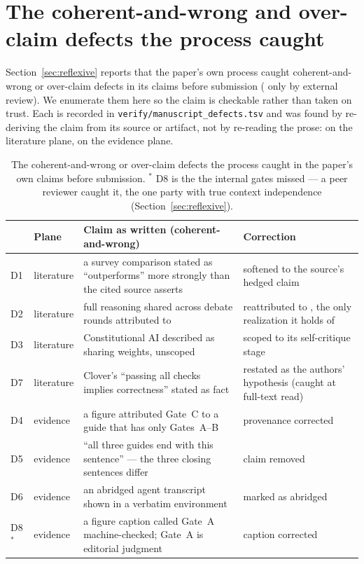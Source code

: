 \documentclass[11pt]{article}
\newcommand{\code}[1]{\texttt{#1}}
\begin{document}
\appendix
\section{The coherent-and-wrong and over-claim defects the process caught}
\label{app:reflexdefects}

Section~\ref{sec:reflexive} reports that the paper's own process caught \ResReflexDefects{}
coherent-and-wrong or over-claim defects in its claims before submission
(\ResCalibExternalCatches{} only by external review). We enumerate them here so the claim is
checkable rather than taken on trust. Each is recorded in
\code{verify/manuscript\_defects.tsv} and was found by re-deriving the claim from its source
or artifact, not by re-reading the prose: \ResReflexDefectsLit{} on the literature plane,
\ResReflexDefectsEvid{} on the evidence plane.

\begin{table}[h]
\centering\small
\begin{tabularx}{\textwidth}{@{}l l Y Y@{}}
\toprule
 & \textbf{Plane} & \textbf{Claim as written (coherent-and-wrong)} & \textbf{Correction} \\
\midrule
D1 & literature & a survey comparison stated as ``outperforms'' more strongly than the cited
source asserts & softened to the source's hedged claim \\
\addlinespace
D2 & literature & full reasoning shared across debate rounds attributed to
\citet{irving2018debate} & reattributed to \citet{du2023debate}, the only realization it
holds of \\
\addlinespace
D3 & literature & Constitutional AI described as sharing weights, unscoped & scoped to its
self-critique stage \\
\addlinespace
D7 & literature & Clover's ``passing all checks implies correctness'' stated as fact & restated
as the authors' hypothesis (caught at full-text read) \\
\addlinespace
D4 & evidence & a figure attributed Gate~C to a guide that has only Gates~A--B & provenance
corrected \\
\addlinespace
D5 & evidence & ``all three guides end with this sentence'' --- the three closing sentences
differ & claim removed \\
\addlinespace
D6 & evidence & an abridged agent transcript shown in a verbatim environment & marked as
abridged \\
\addlinespace
D8$^\ast$ & evidence & a figure caption called Gate~A machine-checked; Gate~A is editorial
judgment & caption corrected \\
\bottomrule
\end{tabularx}
\caption{The \ResReflexDefects{} coherent-and-wrong or over-claim defects the process caught in the paper's
own claims before submission. $^\ast$ D8 is the \ResCalibExternalCatches{} the internal gates
missed --- a peer reviewer caught it, the one party with true context independence
(Section~\ref{sec:reflexive}).}
\label{tab:reflexdefects}
\end{table}
\end{document}
